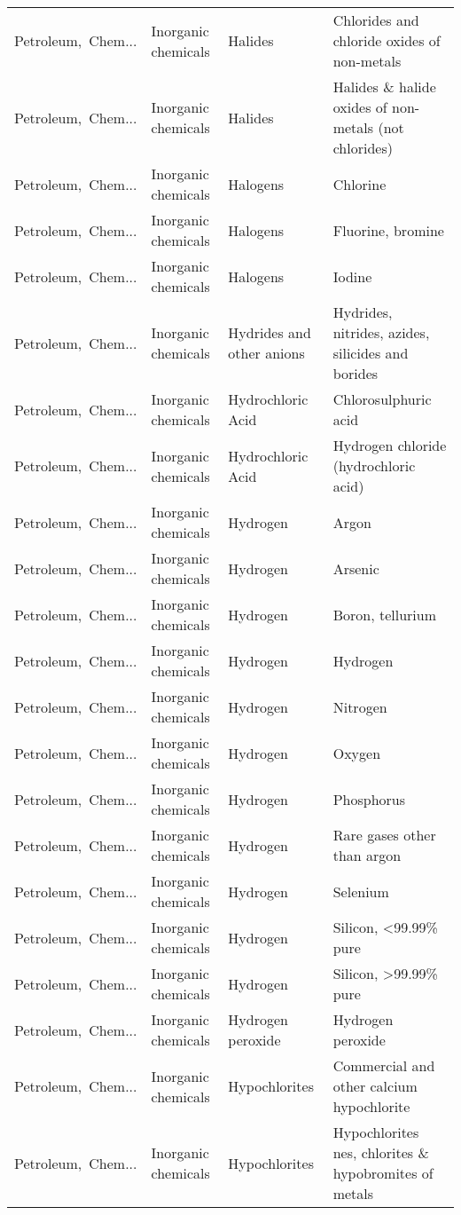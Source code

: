 \begin{appendices}
\begin{xltabular}{\textwidth}{|p{0.10\textwidth}|p{0.25\textwidth}|p{0.24\textwidth}|p{0.31\textwidth}|}
Petroleum,\ Chem... & Inorganic chemicals & Halides & Chlorides and chloride oxides of non-metals \\
Petroleum,\ Chem... & Inorganic chemicals & Halides & Halides \& halide oxides of non-metals (not chlorides) \\
Petroleum,\ Chem... & Inorganic chemicals & Halogens & Chlorine \\
Petroleum,\ Chem... & Inorganic chemicals & Halogens & Fluorine, bromine \\
Petroleum,\ Chem... & Inorganic chemicals & Halogens & Iodine \\
Petroleum,\ Chem... & Inorganic chemicals & Hydrides and other anions & Hydrides, nitrides, azides, silicides and borides \\
Petroleum,\ Chem... & Inorganic chemicals & Hydrochloric Acid & Chlorosulphuric acid \\
Petroleum,\ Chem... & Inorganic chemicals & Hydrochloric Acid & Hydrogen chloride (hydrochloric acid) \\
Petroleum,\ Chem... & Inorganic chemicals & Hydrogen & Argon \\
Petroleum,\ Chem... & Inorganic chemicals & Hydrogen & Arsenic \\
Petroleum,\ Chem... & Inorganic chemicals & Hydrogen & Boron, tellurium \\
Petroleum,\ Chem... & Inorganic chemicals & Hydrogen & Hydrogen \\
Petroleum,\ Chem... & Inorganic chemicals & Hydrogen & Nitrogen \\
Petroleum,\ Chem... & Inorganic chemicals & Hydrogen & Oxygen \\
Petroleum,\ Chem... & Inorganic chemicals & Hydrogen & Phosphorus \\
Petroleum,\ Chem... & Inorganic chemicals & Hydrogen & Rare gases other than argon \\
Petroleum,\ Chem... & Inorganic chemicals & Hydrogen & Selenium \\
Petroleum,\ Chem... & Inorganic chemicals & Hydrogen & Silicon, <99.99\% pure \\
Petroleum,\ Chem... & Inorganic chemicals & Hydrogen & Silicon, >99.99\% pure \\
Petroleum,\ Chem... & Inorganic chemicals & Hydrogen peroxide & Hydrogen peroxide \\
Petroleum,\ Chem... & Inorganic chemicals & Hypochlorites & Commercial and other calcium hypochlorite \\
Petroleum,\ Chem... & Inorganic chemicals & Hypochlorites & Hypochlorites nes, chlorites \& hypobromites of metals \\

\end{xltabular}
\end{appendices}
